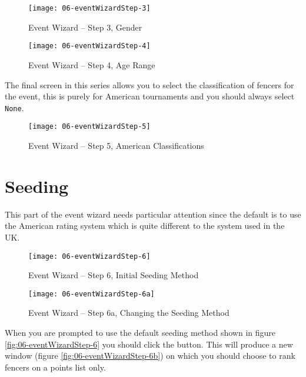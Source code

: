 \documentclass[a4paper,11pt]{memoir}
\begin{document}
\begin{figure}[!ht]
 \centering
 \begin{minipage}{0.4\textwidth}
  \centering
  \texttt{[image: 06-eventWizardStep-3]}
  \caption{Event Wizard -- Step 3, Gender} \label{fig:06-eventWizardStep-3}
\end{minipage}
\hfill
 \begin{minipage}{0.4\textwidth}
  \centering
  \texttt{[image: 06-eventWizardStep-4]}
  \caption{Event Wizard -- Step 4, Age Range} \label{fig:06-eventWizardStep-4}
\end{minipage}
\end{figure}

The final screen in this series allows you to select the classification of fencers for the event, this is purely for American tournaments and you should always select \texttt{None}.

\begin{figure}[!ht]
 \centering
 \texttt{[image: 06-eventWizardStep-5]}
 \caption{Event Wizard -- Step 5, American Classifications} \label{fig:06-eventWizardStep-5}
\end{figure}

\section{Seeding}
This part of the event wizard needs particular attention since the default is to use the American rating system which is quite different to the system used in the UK. 

\begin{figure}[!ht]
 \centering
 \begin{minipage}{0.4\textwidth}
  \centering
  \texttt{[image: 06-eventWizardStep-6]}
  \caption{Event Wizard -- Step 6, Initial Seeding Method} \label{fig:06-eventWizardStep-6}
 \end{minipage}
 \hfill
 \begin{minipage}{0.4\textwidth}
  \centering
  \texttt{[image: 06-eventWizardStep-6a]}
  \caption{Event Wizard -- Step 6a, Changing the Seeding Method} \label{fig:06-eventWizardStep-6a}
 \end{minipage}
\end{figure}

When you are prompted to use the default seeding method shown in figure \ref{fig:06-eventWizardStep-6} you should click the  button. This will produce a new window (figure \ref{fig:06-eventWizardStep-6b}) on which you should choose to rank fencers on a points list only.
\end{document}
